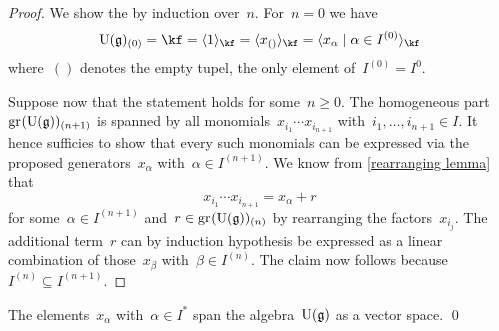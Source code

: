 \begin{proof}
  We show the  by induction over~$n$.
  For~$n = 0$ we have
  \[
    \Univ(\glie)_{(0)}
    =
    \kf
    =
    \gen{ 1 }_{\kf}
    =
    \gen{ x_{()} }_{\kf}
    =
    \gen{ x_\alpha \suchthat \alpha \in I^{(0)} }_{\kf}
  \]
  where~$()$ denotes the empty tupel, the only element of~$I^{(0)} = I^{0}$.
  
  Suppose now that the statement holds for some~$n \geq 0$.
  The homogeneous part~$\gr(\Univ(\glie))_{(n+1)}$ is spanned by all monomials~$x_{i_1} \dotsm x_{i_{n+1}}$ with~$i_1, \dotsc, i_{n+1} \in I$.
  It hence sufficies to show that every such monomials can be expressed via the proposed generators~$x_\alpha$ with~$\alpha \in I^{(n+1)}$.
  We know from \cref{rearranging lemma} that
  \[
    x_{i_1} \dotsm x_{i_{n+1}}
    =
    x_\alpha + r
  \]
  for some~$\alpha \in I^{(n+1)}$ and~$r \in \gr(\Univ(\glie))_{(n)}$ by rearranging the factors~$x_{i_j}$.
  The additional term~$r$ can by induction hypothesis be expressed as a linear combination of those~$x_\beta$ with~$\beta \in I^{(n)}$.
  The claim now follows because~$I^{(n)} \subseteq I^{(n+1)}$.
\end{proof}


\begin{corollary}
  \label{pbw concrete generating part}
  The elements~$x_\alpha$ with~$\alpha \in I^*$ span the algebra~$\operatorname{U}(\mathfrak{g})$ as a vector space.
  \qed
\end{corollary}


